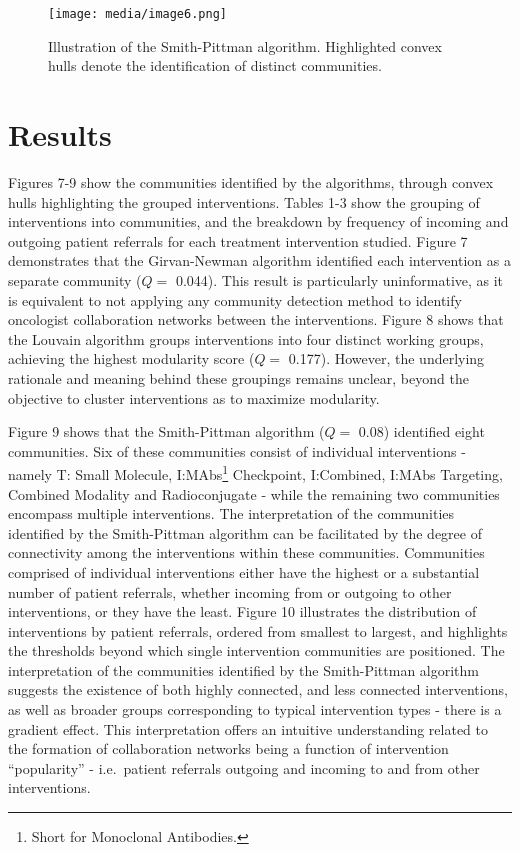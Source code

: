 \documentclass{article}
\begin{document}
\begin{figure}
\centering
\texttt{[image: media/image6.png]}
\caption{Illustration of the Smith-Pittman algorithm.
Highlighted convex hulls denote the identification of distinct
communities.}
\end{figure}

\section{Results}\label{results}

Figures 7-9 show the communities identified by the algorithms, through
convex hulls highlighting the grouped interventions. Tables 1-3
show the grouping of interventions into communities, and the breakdown
by frequency of incoming and outgoing patient referrals for each treatment
intervention studied. Figure 7 demonstrates that the Girvan-Newman
algorithm identified each intervention as a separate community (\(Q =\)
0.044). This result is particularly uninformative, as it is equivalent
to not applying any community detection method to identify oncologist collaboration 
networks between the interventions. Figure 8 shows that the Louvain
algorithm groups interventions into four distinct working groups,
achieving the highest modularity score (\(Q =\) 0.177). However, the
underlying rationale and meaning behind these groupings remains unclear,
beyond the objective to cluster interventions as to maximize
modularity.

Figure 9 shows that the Smith-Pittman algorithm (\(Q =\) 0.08)
identified eight communities. Six of these communities consist of
individual interventions - namely T: Small Molecule, I:MAbs\footnote{Short
  for Monoclonal Antibodies.} Checkpoint, I:Combined, I:MAbs Targeting,
Combined Modality and Radioconjugate - while the remaining two
communities encompass multiple interventions. The interpretation of the
communities identified by the Smith-Pittman algorithm can be facilitated
by the degree of connectivity among the interventions within these
communities. Communities comprised of individual interventions either
have the highest or a substantial number of patient referrals, whether
incoming from or outgoing to other interventions, or they have the
least. Figure 10 illustrates the distribution of interventions by
patient referrals, ordered from smallest to largest, and highlights the
thresholds beyond which single intervention communities are positioned.
The interpretation of the communities identified by the Smith-Pittman
algorithm suggests the existence of both highly connected, and less
connected interventions, as well as broader groups corresponding to
typical intervention types - there is a gradient effect. This interpretation offers an intuitive
understanding related to the formation of collaboration networks being a
function of intervention ``popularity'' - i.e.~patient referrals
outgoing and incoming to and from other interventions.
\end{document}
